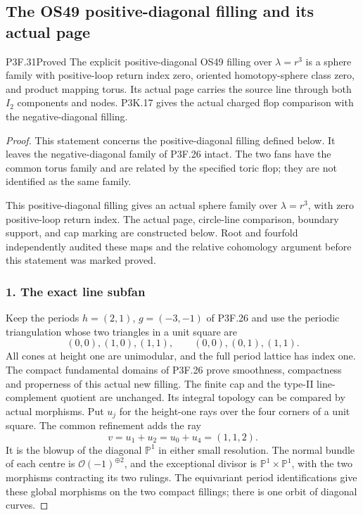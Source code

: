 \subsection{The OS49 positive-diagonal filling and its actual page}
\begin{statement}{P3F.31}{Proved}
The explicit positive-diagonal OS49 filling over $\lambda=r^3$ is a sphere family with positive-loop return index zero, oriented homotopy-sphere class zero, and product mapping torus. Its actual page carries the source line through both $I_2$ components and nodes. P3K.17 gives the actual charged flop comparison with the negative-diagonal filling.
\end{statement}
\begin{proof}
This statement concerns the positive-diagonal filling defined below. It leaves the negative-diagonal family of P3F.26 intact. The two fans have the common torus family and are related by the specified toric flop; they are not identified as the same family.

This positive-diagonal filling gives an actual sphere family over \(\lambda=r^3\), with zero positive-loop return index. The actual page, circle-line comparison, boundary support, and cap marking are constructed below. Root and fourfold independently audited these maps and the relative cohomology argument before this statement was marked proved.

\subsubsection{1. The exact line subfan}\label{the-exact-line-subfan}

Keep the periods \(h=(2,1)\), \(g=(-3,-1)\) of P3F.26 and use the periodic triangulation whose two triangles in a unit square are \[
 (0,0),(1,0),(1,1),\qquad (0,0),(0,1),(1,1).          \tag{P3F.31.1}
\] All cones at height one are unimodular, and the full period lattice has index one. The compact fundamental domains of P3F.26 prove smoothness, compactness and properness of this actual new filling. The finite cap and the type-II line-complement quotient are unchanged. Its integral topology can be compared by actual morphisms. Put \(u_j\) for the height-one rays over the four corners of a unit square. The common refinement adds the ray \[
 v=u_1+u_2=u_0+u_4=(1,1,2).
\] It is the blowup of the diagonal \(\mathbb P^1\) in either small resolution. The normal bundle of each centre is \(\mathcal O(-1)^{\oplus2}\), and the exceptional divisor is \(\mathbb P^1\times\mathbb P^1\), with the two morphisms contracting its two rulings. The equivariant period identifications give these global morphisms on the two compact fillings; there is one orbit of diagonal curves.


\end{proof}

